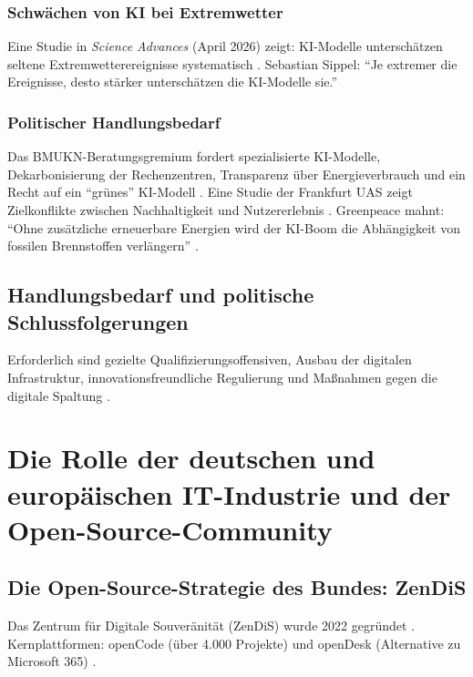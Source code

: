 \documentclass[12pt,a4paper]{article}
\begin{document}
	\subsubsection{Schwächen von KI bei Extremwetter}
	
	Eine Studie in \textit{Science Advances} (April 2026) zeigt: KI-Modelle unterschätzen seltene Extremwetterereignisse systematisch \cite{KIT2026}. Sebastian Sippel: \enquote{Je extremer die Ereignisse, desto stärker unterschätzen die KI-Modelle sie.}
	
	\subsubsection{Politischer Handlungsbedarf}
	
	Das BMUKN-Beratungsgremium fordert spezialisierte KI-Modelle, Dekarbonisierung der Rechenzentren, Transparenz über Energieverbrauch und ein Recht auf ein \enquote{grünes} KI-Modell \cite{BMUKN2026}. Eine Studie der Frankfurt UAS zeigt Zielkonflikte zwischen Nachhaltigkeit und Nutzererlebnis \cite{FrankfurtUAS2026}. Greenpeace mahnt: \enquote{Ohne zusätzliche erneuerbare Energien wird der KI-Boom die Abhängigkeit von fossilen Brennstoffen verlängern} \cite{Greenpeace2025}.
	
	\subsection{Handlungsbedarf und politische Schlussfolgerungen}
	
	Erforderlich sind gezielte Qualifizierungsoffensiven, Ausbau der digitalen Infrastruktur, innovationsfreundliche Regulierung und Maßnahmen gegen die digitale Spaltung \cite{IAB2025a, OECD2025, Bitkom2025}.
	
	\section{Die Rolle der deutschen und europäischen IT-Industrie und der Open-Source-Community}
	
	\subsection{Die Open-Source-Strategie des Bundes: ZenDiS}
	
	Das Zentrum für Digitale Souveränität (ZenDiS) wurde 2022 gegründet \cite{ZenDiS2025}. Kernplattformen: openCode (über 4.000 Projekte) und openDesk (Alternative zu Microsoft 365) \cite{Heise2025a, AllThingsOpen2025}.
	
\end{document}
